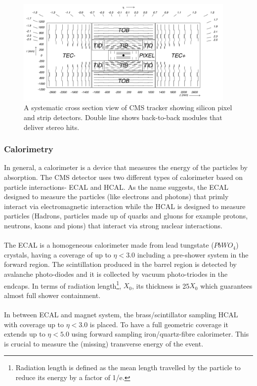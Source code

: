 {{{\begin{figure}[!htbp]
	\centering
	\includegraphics[width=0.95\textwidth]{figures/LHC/tracker-cross-section.png}
	\caption{A systematic cross section view of CMS tracker showing silicon pixel and strip detectors. Double line shows back-to-back modules that deliver stereo hits.}
	\label{fig:tracker-cross-section}
\end{figure}


\subsubsection{Calorimetry} %
\label{ssub:calorimetry}
In general, a calorimeter is a device that measures the energy of the particles by absorption. The CMS detector uses two different types of calorimeter based on particle interactions- ECAL and HCAL. As the name suggests, the ECAL designed to measure the particles (like electrons and photons) that primly interact via electromagnetic interaction while the HCAL is designed to measure particles (Hadrons, particles made up of quarks and gluons for example protons, neutrons, kaons and pions) that interact via strong nuclear interactions.\\\\
The ECAL is a homogeneous calorimeter made from lead tungstate ($PbWO_4$) crystals, having a coverage of up to $\eta < 3.0$ including a pre-shower system in the forward region. The scintillation produced in the barrel region is detected by avalanche photo-diodes and it is collected by vacuum photo-triodes in the endcaps. In terms of radiation length\footnote{Radiation length is defined as the mean length travelled by the particle to reduce its energy by a factor of 1/e.}, $X_0$, its thickness is 25$X_0$ which guarantees almost full shower containment.\\\\
In between ECAL and magnet system, the brass/scintillator sampling HCAL with coverage up to $\eta < 3.0$ is placed. To have a full geometric coverage it extends up to $\eta < 5.0$ using forward sampling iron/quartz-fibre calorimeter. This is crucial to measure the (missing) transverse energy of the event.

}}}

